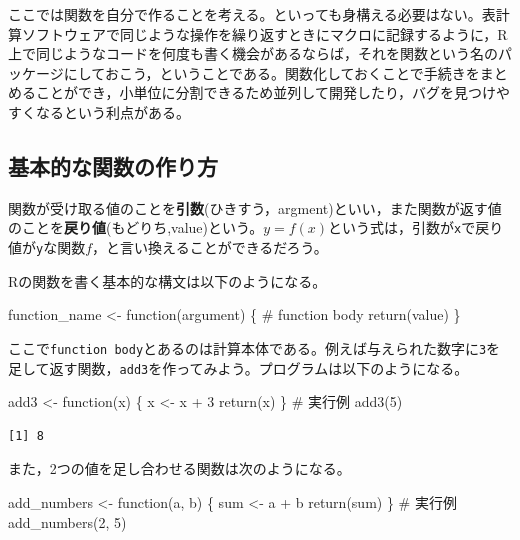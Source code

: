 \documentclass[
  a4paper,
]{ltjsbook}
\newenvironment{Shaded}{\begin{snugshade}}{\end{snugshade}}
\newcommand{\CommentTok}[1]{\textcolor[rgb]{0.37,0.37,0.37}{#1}}
\newcommand{\ControlFlowTok}[1]{\textcolor[rgb]{0.00,0.23,0.31}{#1}}
\newcommand{\DecValTok}[1]{\textcolor[rgb]{0.68,0.00,0.00}{#1}}
\newcommand{\FunctionTok}[1]{\textcolor[rgb]{0.28,0.35,0.67}{#1}}
\newcommand{\NormalTok}[1]{\textcolor[rgb]{0.00,0.23,0.31}{#1}}
\newcommand{\OtherTok}[1]{\textcolor[rgb]{0.00,0.23,0.31}{#1}}
\newcommand{\SpecialCharTok}[1]{\textcolor[rgb]{0.37,0.37,0.37}{#1}}
\begin{document}
ここでは関数を自分で作ることを考える。といっても身構える必要はない。表計算ソフトウェアで同じような操作を繰り返すときにマクロに記録するように，R上で同じようなコードを何度も書く機会があるならば，それを関数という名のパッケージにしておこう，ということである。関数化しておくことで手続きをまとめることができ，小単位に分割できるため並列して開発したり，バグを見つけやすくなるという利点がある。

\subsection{基本的な関数の作り方}\label{ux57faux672cux7684ux306aux95a2ux6570ux306eux4f5cux308aux65b9}

関数が受け取る値のことを\textbf{引数}(ひきすう，argment)といい，また関数が返す値のことを\textbf{戻り値}(もどりち,value)という。\(y=f(x)\)という式は，引数が\texttt{x}で戻り値が\texttt{y}な関数\(f\)，と言い換えることができるだろう。

Rの関数を書く基本的な構文は以下のようになる。

\begin{Shaded}
\begin{Highlighting}[]
\NormalTok{function\_name }\OtherTok{\textless{}{-}} \ControlFlowTok{function}\NormalTok{(argument) \{}
   \CommentTok{\# function body}
   \FunctionTok{return}\NormalTok{(value)}
\NormalTok{\}}
\end{Highlighting}
\end{Shaded}

ここで\texttt{function\ body}とあるのは計算本体である。例えば与えられた数字に\texttt{3}を足して返す関数，\texttt{add3}を作ってみよう。プログラムは以下のようになる。

\begin{Shaded}
\begin{Highlighting}[]
\NormalTok{add3 }\OtherTok{\textless{}{-}} \ControlFlowTok{function}\NormalTok{(x) \{}
\NormalTok{  x }\OtherTok{\textless{}{-}}\NormalTok{ x }\SpecialCharTok{+} \DecValTok{3}
  \FunctionTok{return}\NormalTok{(x)}
\NormalTok{\}}
\CommentTok{\# 実行例}
\FunctionTok{add3}\NormalTok{(}\DecValTok{5}\NormalTok{)}
\end{Highlighting}
\end{Shaded}

\begin{verbatim}
[1] 8
\end{verbatim}

また，2つの値を足し合わせる関数は次のようになる。

\begin{Shaded}
\begin{Highlighting}[]
\NormalTok{add\_numbers }\OtherTok{\textless{}{-}} \ControlFlowTok{function}\NormalTok{(a, b) \{}
\NormalTok{  sum }\OtherTok{\textless{}{-}}\NormalTok{ a }\SpecialCharTok{+}\NormalTok{ b}
  \FunctionTok{return}\NormalTok{(sum)}
\NormalTok{\}}
\CommentTok{\# 実行例}
\FunctionTok{add\_numbers}\NormalTok{(}\DecValTok{2}\NormalTok{, }\DecValTok{5}\NormalTok{)}
\end{Highlighting}
\end{Shaded}
\end{document}
